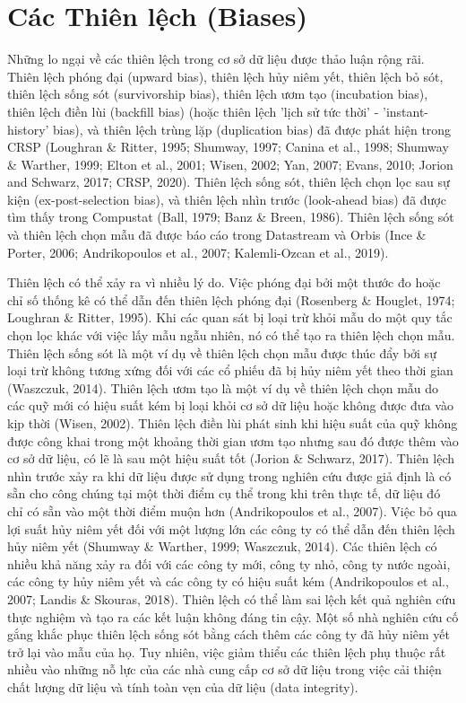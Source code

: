 \section{Các Thiên lệch (Biases)}

Những lo ngại về các thiên lệch trong cơ sở dữ liệu được thảo luận rộng rãi. Thiên lệch phóng đại (upward bias), thiên lệch hủy niêm yết, thiên lệch bỏ sót, thiên lệch sống sót (survivorship bias), thiên lệch ươm tạo (incubation bias), thiên lệch điền lùi (backfill bias) (hoặc thiên lệch 'lịch sử tức thời' - 'instant-history' bias), và thiên lệch trùng lặp (duplication bias) đã được phát hiện trong CRSP (Loughran \& Ritter, 1995; Shumway, 1997; Canina et al., 1998; Shumway \& Warther, 1999; Elton et al., 2001; Wisen, 2002; Yan, 2007; Evans, 2010; Jorion and Schwarz, 2017; CRSP, 2020). Thiên lệch sống sót, thiên lệch chọn lọc sau sự kiện (ex-post-selection bias), và thiên lệch nhìn trước (look-ahead bias) đã được tìm thấy trong Compustat (Ball, 1979; Banz \& Breen, 1986). Thiên lệch sống sót và thiên lệch chọn mẫu đã được báo cáo trong Datastream và Orbis (Ince \& Porter, 2006; Andrikopoulos et al., 2007; Kalemli-Ozcan et al., 2019).

Thiên lệch có thể xảy ra vì nhiều lý do. Việc phóng đại bởi một thước đo hoặc chỉ số thống kê có thể dẫn đến thiên lệch phóng đại (Rosenberg \& Houglet, 1974; Loughran \& Ritter, 1995). Khi các quan sát bị loại trừ khỏi mẫu do một quy tắc chọn lọc khác với việc lấy mẫu ngẫu nhiên, nó có thể tạo ra thiên lệch chọn mẫu. Thiên lệch sống sót là một ví dụ về thiên lệch chọn mẫu được thúc đẩy bởi sự loại trừ không tương xứng đối với các cổ phiếu đã bị hủy niêm yết theo thời gian (Waszczuk, 2014). Thiên lệch ươm tạo là một ví dụ về thiên lệch chọn mẫu do các quỹ mới có hiệu suất kém bị loại khỏi cơ sở dữ liệu hoặc không được đưa vào kịp thời (Wisen, 2002). Thiên lệch điền lùi phát sinh khi hiệu suất của quỹ không được công khai trong một khoảng thời gian ươm tạo nhưng sau đó được thêm vào cơ sở dữ liệu, có lẽ là sau một hiệu suất tốt (Jorion \& Schwarz, 2017). Thiên lệch nhìn trước xảy ra khi dữ liệu được sử dụng trong nghiên cứu được giả định là có sẵn cho công chúng tại một thời điểm cụ thể trong khi trên thực tế, dữ liệu đó chỉ có sẵn vào một thời điểm muộn hơn (Andrikopoulos et al., 2007). Việc bỏ qua lợi suất hủy niêm yết đối với một lượng lớn các công ty có thể dẫn đến thiên lệch hủy niêm yết (Shumway \& Warther, 1999; Waszczuk, 2014). Các thiên lệch có nhiều khả năng xảy ra đối với các công ty mới, công ty nhỏ, công ty nước ngoài, các công ty hủy niêm yết và các công ty có hiệu suất kém (Andrikopoulos et al., 2007; Landis \& Skouras, 2018). Thiên lệch có thể làm sai lệch kết quả nghiên cứu thực nghiệm và tạo ra các kết luận không đáng tin cậy. Một số nhà nghiên cứu cố gắng khắc phục thiên lệch sống sót bằng cách thêm các công ty đã hủy niêm yết trở lại vào mẫu của họ. Tuy nhiên, việc giảm thiểu các thiên lệch phụ thuộc rất nhiều vào những nỗ lực của các nhà cung cấp cơ sở dữ liệu trong việc cải thiện chất lượng dữ liệu và tính toàn vẹn của dữ liệu (data integrity).

